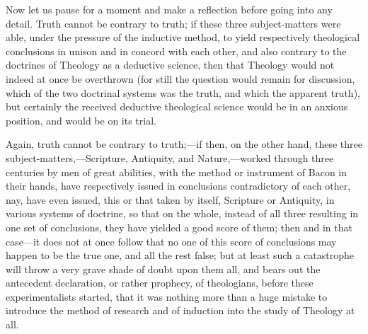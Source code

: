 Now let us pause for a moment and make a reflection before going
into any detail. Truth cannot be contrary to truth; if these three
subject-matters were able, under the pressure of the inductive method,
to yield respectively theological conclusions in unison and in concord
with each other, and also contrary to the doctrines of Theology
as a deductive science, then that Theology would not indeed at once be
overthrown (for still the question would remain for discussion, which
of the two doctrinal systems was the truth, and which the apparent
truth), but certainly the received deductive theological science would
be in an anxious position, and would be on its trial.

Again, truth cannot be contrary to truth;—if then, on the other
hand, these three subject-matters,—Scripture, Antiquity, and Nature,—worked
through three centuries by men of great abilities, with the method or
instrument of Bacon in their hands, have respectively issued in
conclusions contradictory of each other, nay, have even issued, this
or that taken by itself, Scripture or Antiquity, in various systems of
doctrine, so that on the whole, instead of all three resulting in one
set of conclusions, they have yielded a good score of them; then and
in that case—it does not at once follow that no one of this score of
conclusions may happen to be the true one, and all the rest false; but
at least such a catastrophe will throw a very grave shade of doubt
upon them all, and bears out the antecedent declaration, or rather
prophecy, of theologians, before these experimentalists started, that
it was nothing more than a huge mistake to introduce the method of
research and of induction into the study of Theology at all.

